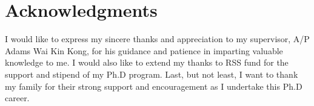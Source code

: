 \chapter* {Acknowledgments}

I would like to express my sincere thanks and appreciation to my supervisor, A/P Adams Wai Kin Kong, for his guidance and patience in imparting valuable knowledge to me. I would also like to extend my thanks to RSS fund for the support and stipend of my Ph.D program. 
Last, but not least, I want to thank my family for their strong support and encouragement as I undertake this Ph.D career.

